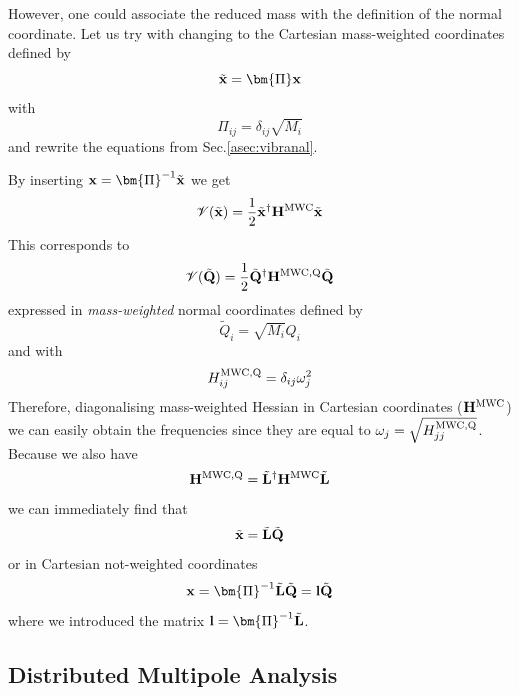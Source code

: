 \documentclass[b5paper,oneside,fleqn,11pt]{book}
\newcommand{\BM}[1]{\bm{#1}}
\begin{document}
\begin{appendices}
However, one could 
associate the reduced mass with the definition of the normal coordinate.
Let us try with changing to the Cartesian mass\hyp{}weighted coordinates defined by
\begin{equation}
\tilde{\bf x} = {\BM \Pi}{\bf x} 
\end{equation}
with
\begin{equation}
\Pi_{ij} = \delta_{ij} \sqrt{M_i}
\end{equation}
and rewrite the equations from Sec.\ref{asec:vibranal}.

By inserting ${\bf x}={\BM \Pi}^{-1}\tilde{\bf x}$ we get
\begin{equation}
\mathscr{V}(\tilde{\bf x}) = \frac{1}{2} \tilde{\bf x}^{\dagger} {\bf H}^{\rm MWC}  \tilde{\bf x}
\end{equation}
This corresponds to 
\begin{equation}
\mathscr{V}(\tilde{\bf Q}) = \frac{1}{2} \tilde{\bf Q}^{\dagger} {\bf H}^{\rm MWC,Q}  \tilde{\bf Q}
\end{equation}
expressed in \emph{mass-weighted} normal coordinates defined by
\begin{equation}
\tilde{Q}_i = \sqrt{M_i} Q_i
\end{equation}
and with 
\begin{equation}
H_{ij}^{\rm MWC,Q} = \delta_{ij} \omega_j^2
\end{equation}
Therefore, diagonalising mass-weighted Hessian in Cartesian coordinates (${\bf H}^{\rm MWC}$)
we can easily obtain the frequencies since they are equal to $\omega_j=\sqrt{H_{jj}^{\rm MWC,Q}}$.
Because we also have
\begin{equation}
{\bf H}^{\rm MWC,Q} = \tilde{\bf L}^{\dagger} {\bf H}^{\rm MWC} \tilde{\bf L}
\end{equation}
we can immediately find that
\begin{equation}
\tilde{\bf x} = \tilde{\bf L} \tilde{\bf Q}
\end{equation}
or in Cartesian not-weighted coordinates
\begin{equation}
{\bf x} = {\BM \Pi}^{-1} \tilde{\bf L} \tilde{\bf Q} = {\bf l} \tilde{\bf Q}
\end{equation}
where we introduced the matrix ${\bf l}={\BM \Pi}^{-1} \tilde{\bf L}$.



\begin{refsection}
\chapter{Distributed Multipole Analysis\label{c:dma}}


\end{refsection}
\end{appendices}
\end{document}
